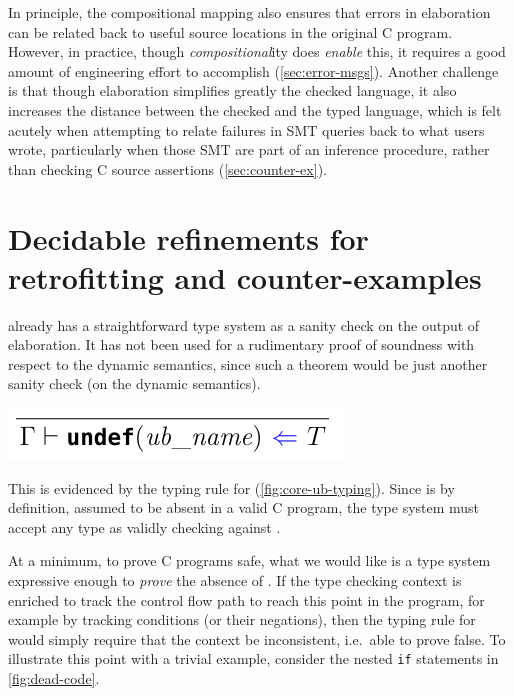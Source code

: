 In principle, the compositional mapping also ensures that errors in 
elaboration can be related back to useful source locations in the original C
program. However, in practice, though \emph{compositional}ity does
\emph{enable} this, it requires a good amount of engineering effort to
accomplish (\cref{sec:error-msgs}). Another challenge is that though
elaboration simplifies greatly the checked language, it also increases the
distance between the checked and the typed language, which is felt acutely when
attempting to relate failures in SMT queries back to what users wrote,
particularly when those SMT are part of an inference procedure, rather
than checking C source assertions (\cref{sec:counter-ex}).

\section{Decidable refinements for retrofitting and counter-examples}

 already has a straightforward  type system as a
sanity check on the output of elaboration. It has not been used for a
rudimentary proof of soundness with respect to the dynamic semantics, since
such a theorem would be just another sanity check (on the dynamic semantics).

\begin{marginfigure}
    \centering
    \includegraphics{figures/core-ub-typing}
    \caption{Typing rule for the  pure expression as %
        mentioned in \textcite{memarian2022cerberus}. The type system is set up
        in a  way, with checking judgements represented by
        $\color{blue}{\Leftarrow}$, and synthesis with
        $\color{red}{\Rightarrow}$.}\label{fig:core-ub-typing}
\end{marginfigure}

This is evidenced by the typing rule for  %
(\cref{fig:core-ub-typing}). Since  is by definition, assumed to be
absent in a valid C program, the type system must accept any type as validly
checking against . %

At a minimum, to prove C programs safe, what we would like is a type system
expressive enough to \emph{prove} the absence of . If the type checking
context is enriched to track the control flow path to reach this point in the
program, for example by tracking conditions (or their negations), then the
typing rule for  would simply require that the context %
be inconsistent, i.e.\ able to prove false. To illustrate this point with
a trivial example, consider the nested \texttt{if} statements in
\cref{fig:dead-code}.

